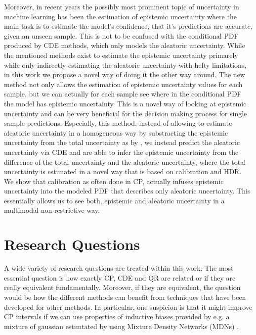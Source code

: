 Moreover, in recent years the possibly most prominent topic of uncertainty in machine learning has been the estimation of epistemic uncertainty \cite{barber1998ensemble, neal2012bayesian, gal_dropout_2016,schweighofer2023quantification, gawlikowski2023survey}%
where the main task is to estimate the model's confidence, that it's predictions are accurate, given an unseen sample. This is not to be confused with the conditional PDF produced by CDE methods, which only models the aleatoric uncertainty. While the mentioned methods exist to estimate the epistemic uncertainty primarely while only indirectly estimating the aleatoric uncertainty with hefty limitations, in this work we propose a novel way of doing it the other way around. The new method not only allows the estimation of epistemic uncertainty values for each sample, but we can actually for each sample see where in the conditional PDF the model has epistemic uncertainty. This is a novel way of looking at epistemic uncertainty and can be very beneficial for the decision making process for single sample predictions. Especially, this method, instead of allowing to estimate aleatoric uncertainty in a homogeneous way by substracting the epistemic uncertainty from the total uncertainty as by \cite{gal_dropout_2016}, we instead predict the aleatoric uncertainty via CDE and are able to infer the epistemic uncertainty from the difference of the total uncertainty and the aleatoric uncertainty, where the total uncertainty is estimated in a novel way that is based on calibration and HDR. We show that calibration as often done in CP, actually infuses epistemic uncertainty into the modeled PDF that describes only aleatoric uncertainty. This essentially allows us to see both, epistemic and aleatoric uncertainty in a multimodal non-restrictive way.


\section{Research Questions}\label{sec:questions}

A wide variety of research questions are treated within this work. The most essential question is how exactly CP, CDE and QR are related or if they are really equivalent fundamentally. Moreover, if they are equivalent, the question would be how the different methods can benefit from techniques that have been developed for other methods. In particular, one suspicion is that it might improve CP intervals if we can use properties of inductive biases provided by e.g. a mixture of gaussian estimtated by using Mixture Density Networks (MDNs) \cite{bishop1994mixture}.

